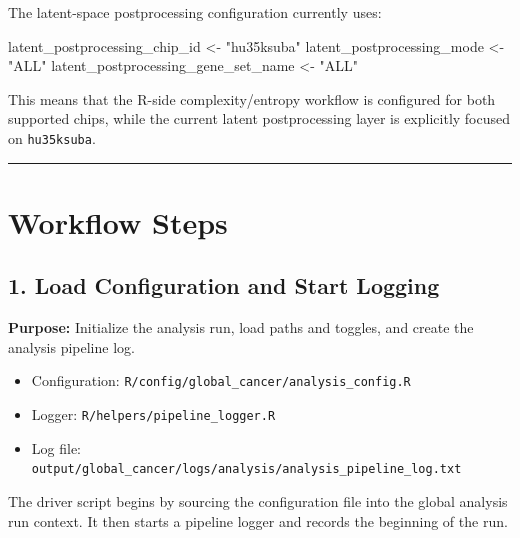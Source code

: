 \documentclass[
  letterpaper,
  DIV=11,
  numbers=noendperiod,
  openany,
  oneside]{scrreprt}
\newenvironment{Shaded}{\begin{snugshade}}{\end{snugshade}}
\newcommand{\NormalTok}[1]{\textcolor[rgb]{0.00,0.23,0.31}{#1}}
\newcommand{\OtherTok}[1]{\textcolor[rgb]{0.00,0.23,0.31}{#1}}
\newcommand{\StringTok}[1]{\textcolor[rgb]{0.13,0.47,0.30}{#1}}
\providecommand{\tightlist}{%
  \setlength{\itemsep}{0pt}\setlength{\parskip}{0pt}}
\begin{document}
The latent-space postprocessing configuration currently uses:

\begin{Shaded}
\begin{Highlighting}[]
\NormalTok{latent\_postprocessing\_chip\_id       }\OtherTok{\textless{}{-}} \StringTok{"hu35ksuba"}
\NormalTok{latent\_postprocessing\_mode          }\OtherTok{\textless{}{-}} \StringTok{"ALL"}
\NormalTok{latent\_postprocessing\_gene\_set\_name }\OtherTok{\textless{}{-}} \StringTok{"ALL"}
\end{Highlighting}
\end{Shaded}

This means that the R-side complexity/entropy workflow is configured for
both supported chips, while the current latent postprocessing layer is
explicitly focused on \texttt{hu35ksuba}.

\begin{center}\rule{0.5\linewidth}{0.5pt}\end{center}

\section*{Workflow Steps}\label{workflow-steps-1}


\subsection*{1. Load Configuration and Start
Logging}\label{load-configuration-and-start-logging}

\textbf{Purpose:} Initialize the analysis run, load paths and toggles,
and create the analysis pipeline log.

\begin{itemize}
\tightlist
\item
  Configuration: \texttt{R/config/global\_cancer/analysis\_config.R}
\item
  Logger: \texttt{R/helpers/pipeline\_logger.R}
\item
  Log file:
  \texttt{output/global\_cancer/logs/analysis/analysis\_pipeline\_log.txt}
\end{itemize}

The driver script begins by sourcing the configuration file into the
global analysis run context. It then starts a pipeline logger and
records the beginning of the run.
\end{document}
